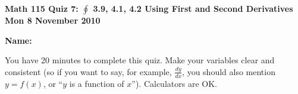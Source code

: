 \documentclass[11pt,letterpaper]{article}
\begin{document}
\flushleft
\begin{multicols}{2}


\begin{large}\textbf{Math 115 Quiz 7: $\oint $ 3.9, 4.1, 4.2 Using First and Second Derivatives \\
Mon 8 November 2010}\end{large}

\textbf{Name:  }\underline{\hspace{35ex}}

\vspace{.5in}

\end{multicols}

\pagestyle{empty}

\flushleft

You have 20 minutes to complete this quiz.  Make your variables clear and
consistent (so if you want to say, for example, $\frac{dy}{dx}$, you should also
mention $y=f(x)$, or ``$y$ is a function of $x$'').  Calculators are OK.  
\end{document}
